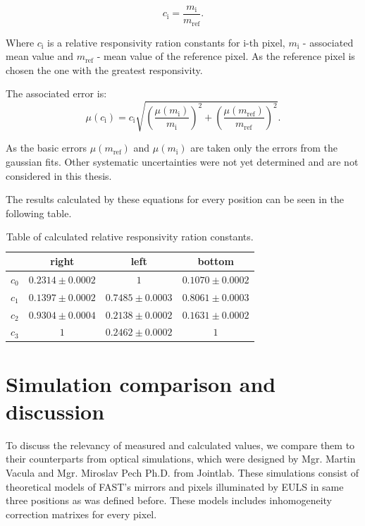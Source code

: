 \begin{equation}
c_{\textrm{i}} = \frac{m_{\textrm{i}}}{m_{\textrm{ref}}}.
\end{equation}

Where $c_{\textrm{i}}$ is a relative responsivity ration constants for i-th pixel, $m_{\textrm{i}}$ - associated mean value and $m_{\textrm{ref}}$ - mean value of the reference pixel. As the reference pixel is chosen the one with the greatest responsivity. 
\par
The associated error is:
\begin{equation}
\mu(c_{\textrm{i}}) = c_{\textrm{i}} \sqrt{(\frac{\mu(m_{\textrm{i}})}{m_{\textrm{i}}})^2 + (\frac{\mu(m_{\textrm{ref}})}{m_{\textrm{ref}}})^2}.
\end{equation}

As the basic errors $\mu(m_{\textrm{ref}})$ and $\mu(m_{\textrm{i}})$ are taken only the errors from the gaussian fits. Other systematic uncertainties were not yet determined and are not considered in this thesis.
\par
The results calculated by these equations for every position can be seen in the following table.

\begin{table}[H]
\centering
\begin{tabular}{|c|c|c|c|}
\hline
   & right & left & bottom \\ \hline
$c_0$ & $0.2314 \pm 0.0002$    & $1$   				   & $0.1070 \pm 0.0002$     \\ \hline
$c_1$ & $0.1397 \pm 0.0002$    & $0.7485 \pm 0.0003$   & $0.8061 \pm 0.0003$      \\ \hline
$c_2$ & $0.9304 \pm 0.0004$    & $0.2138 \pm 0.0002$   & $0.1631 \pm 0.0002$      \\ \hline
$c_3$ & $1$    				   & $0.2462 \pm 0.0002$   & $1$      \\ \hline
\end{tabular}
\caption{Table of calculated relative responsivity ration constants.}
 \label{CalibConstTbl}
\end{table}



\section{Simulation comparison and discussion}

To discuss the relevancy of measured and calculated values, we compare them to their counterparts from optical simulations, which were designed by Mgr. Martin Vacula and Mgr. Miroslav Pech Ph.D. from Jointlab. These simulations consist of theoretical models of FAST's mirrors and pixels illuminated by EULS in same three positions as was defined before. These models includes inhomogeneity correction matrixes for every pixel.

